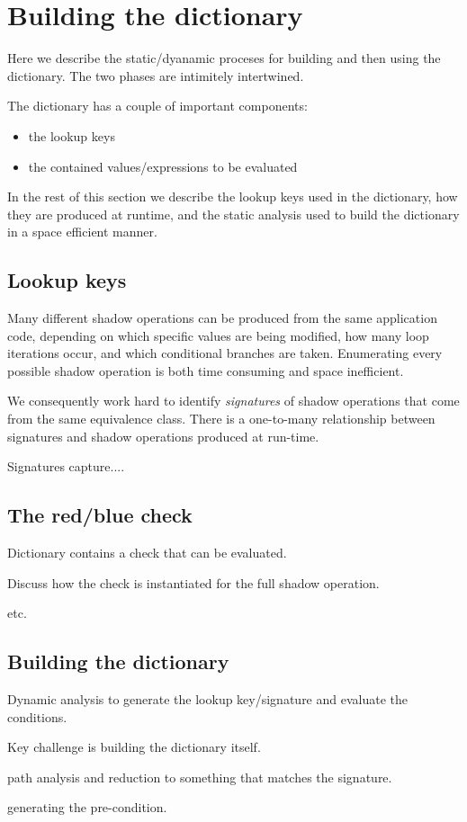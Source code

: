 
\section{Building the dictionary}
\label{sect:dictionary}

Here we describe the static/dyanamic proceses for building and then
using the dictionary.  The two phases are intimitely intertwined.


The dictionary has a couple of important components:
\begin{itemize}
\item the lookup keys
\item the contained values/expressions to be evaluated
\end{itemize}

In the rest of this section we describe the lookup keys used in the
dictionary, how they are produced at runtime, and the static analysis
used to build the dictionary in a space efficient manner.


\subsection{Lookup keys}
Many different shadow operations can be produced from the same
application code, depending on which specific values are being
modified, how many loop iterations occur, and which conditional
branches are taken.  Enumerating every possible shadow operation is
both time consuming and space inefficient.

We consequently work hard to identify {\em signatures} of shadow
operations that come from the same equivalence class.  There is a
one-to-many relationship between signatures and shadow operations
produced at run-time.   

Signatures capture....

\subsection{The red/blue check}
Dictionary contains a check that can be evaluated.

Discuss how the check is instantiated for the full shadow operation.

etc.


\subsection{Building the dictionary}

Dynamic analysis to generate the lookup key/signature and evaluate the conditions.

Key challenge is building the dictionary itself.

path analysis and reduction to something that matches the signature.

generating the pre-condition.

\fi

\fi

\fi

